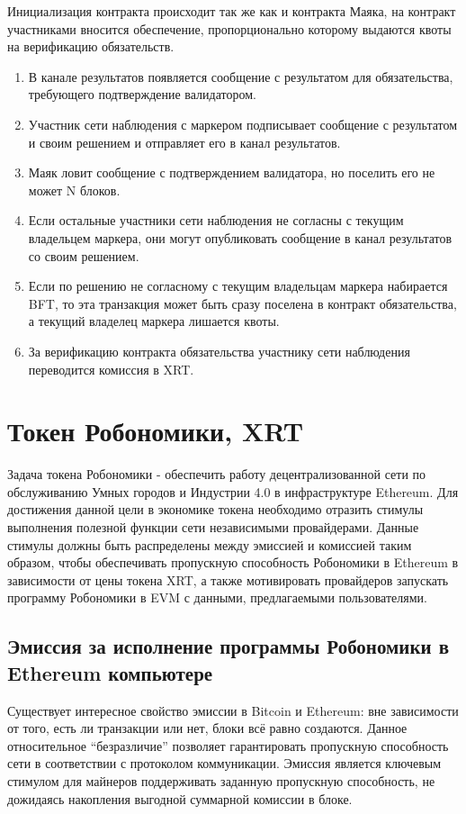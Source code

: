 \documentclass{article}
\begin{document}
Инициализация контракта происходит так же как и контракта Маяка, на контракт участниками вносится обеспечение, пропорционально которому выдаются квоты на верификацию обязательств.
\begin{enumerate}
	\item В канале результатов появляется сообщение с результатом для обязательства, требующего подтверждение валидатором.
	\item Участник сети наблюдения с маркером подписывает сообщение с результатом и своим решением и отправляет его в канал результатов.
	\item Маяк ловит сообщение с подтверждением валидатора, но поселить его не может N блоков.
	\item Если остальные участники сети наблюдения не согласны с текущим владельцем маркера, они могут опубликовать сообщение в канал результатов со своим решением.
	\item Если по решению не согласному с текущим владельцам маркера набирается BFT, то эта транзакция может быть сразу поселена в контракт обязательства, а текущий владелец маркера лишается квоты.
	\item За верификацию контракта обязательства участнику сети наблюдения переводится комиссия в XRT.
\end{enumerate}

\section{Токен Робономики, XRT}

Задача токена Робономики - обеспечить работу децентрализованной сети по обслуживанию Умных городов и Индустрии 4.0 в инфраструктуре Ethereum. Для достижения данной цели в экономике токена необходимо отразить стимулы выполнения полезной функции сети независимыми провайдерами. Данные стимулы должны быть распределены между эмиссией и комиссией таким образом, чтобы обеспечивать пропускную способность Робономики в Ethereum в зависимости от цены токена XRT, а также мотивировать провайдеров запускать программу Робономики в EVM с данными, предлагаемыми пользователями.

\subsection{Эмиссия за исполнение программы Робономики в Ethereum компьютере}

Существует интересное свойство эмиссии в Bitcoin и Ethereum: вне зависимости от того, есть ли транзакции или нет, блоки всё равно создаются. Данное относительное “безразличие” позволяет гарантировать пропускную способность сети в соответствии с протоколом коммуникации. Эмиссия является ключевым стимулом для майнеров поддерживать заданную пропускную способность, не дожидаясь накопления выгодной суммарной комиссии в блоке.
\end{document}
